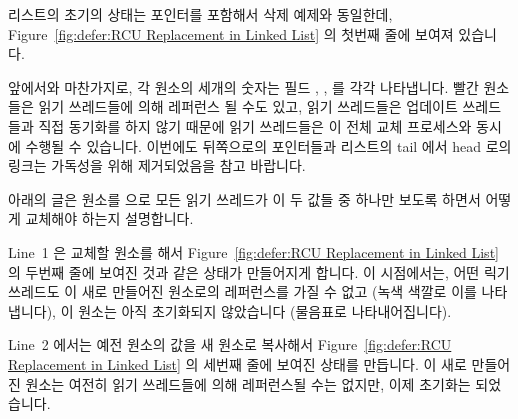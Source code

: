 리스트의 초기의 상태는  포인터를 포함해서 삭제 예제와 동일한데,
Figure~\ref{fig:defer:RCU Replacement in Linked List} 의 첫번째 줄에 보여져
있습니다.

앞에서와 마찬가지로, 각 원소의 세개의 숫자는 필드 , ,  를
각각 나타냅니다.
빨간 원소들은 읽기 쓰레드들에 의해 레퍼런스 될 수도 있고, 읽기
쓰레드들은 업데이트 쓰레드들과 직접 동기화를 하지 않기 때문에 읽기
쓰레드들은 이 전체 교체 프로세스와 동시에 수행될 수 있습니다.
이번에도 뒤쪽으로의 포인터들과 리스트의 tail 에서 head 로의 링크는 가독성을
위해 제거되었음을 참고 바랍니다.

아래의 글은  원소를  으로 모든 읽기 쓰레드가 이 두 값들 중
하나만 보도록 하면서 어떻게 교체해야 하는지 설명합니다.

Line~1 은 교체할 원소를  해서
Figure~\ref{fig:defer:RCU Replacement in Linked List} 의 두번째 줄에 보여진
것과 같은 상태가 만들어지게 합니다.
이 시점에서는, 어떤 릭기 쓰레드도 이 새로 만들어진 원소로의 레퍼런스를 가질 수
없고 (녹색 색깔로 이를 나타냅니다), 이 원소는 아직 초기화되지 않았습니다
(물음표로 나타내어집니다).

Line~2 에서는 예전 원소의 값을 새 원소로 복사해서
Figure~\ref{fig:defer:RCU Replacement in Linked List} 의 세번째 줄에 보여진
상태를 만듭니다.
이 새로 만들어진 원소는 여전히 읽기 쓰레드들에 의해 레퍼런스될 수는 없지만,
이제 초기화는 되었습니다.


